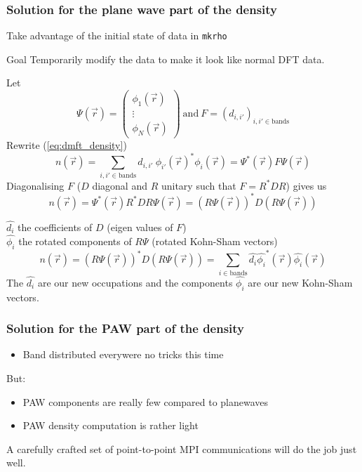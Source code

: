 \begin{frame}
  \frametitle{Solution for the plane wave part of the density}
  Take advantage of the initial state of data in \texttt{mkrho}
  
  \begin{block}{Goal}
    Temporarily modify the data to make it look like normal DFT data.
  \end{block}
\end{frame}

\renewcommand{\hat}{\widehat}
\begin{frame}
  Let
  \begin{equation}
    \Psi(\vec{r}) =
    \left(
    \begin{matrix}
      \phi_1(\vec{r})\\
      \vdots\\
      \phi_N(\vec{r})
    \end{matrix}
    \right)
      ~
    \text{and} ~ F = (d_{i,i'})_{i,i' \in \text{bands}}
  \end{equation}
  Rewrite (\ref{eq:dmft_density})
  \begin{equation}
    n(\vec{r}) =
    \sum_{i, i' \in \text{bands}} d_{i,i'}~\phi_{i'}(\vec{r})^* \phi_i(\vec{r})
    = \Psi^*(\vec{r}) F \Psi(\vec{r})
  \end{equation}
  Diagonalising $F$ ($D$ diagonal and $R$ unitary such that $F = R^*  D R$) gives us
  \begin{equation}
    n(\vec{r}) = \Psi^*(\vec{r}) R^* D R \Psi(\vec{r})
    = (R \Psi(\vec{r}))^* D (R \Psi(\vec{r}))
  \end{equation}
\end{frame}

\begin{frame}
  $\hat{d_i}$ the coefficients of $D$ (eigen values of $F$) \\
  $\hat{\phi_i}$ the rotated components of $R\Psi$ (rotated Kohn-Sham vectors)
  \begin{equation}
    n(\vec{r}) = (R \Psi(\vec{r}))^* D (R \Psi(\vec{r}))  = \sum_{i \in \text{bands}} \hat{d_i} \hat{\phi_i}^*(\vec{r}) \hat{\phi_i}(\vec{r}) 
  \end{equation}
  The $\hat{d_i}$ are our new occupations and the components $\hat{\phi_i}$ are our new Kohn-Sham vectors.
\end{frame}

\begin{frame}
  \frametitle{Solution for the PAW part of the density}
  \begin{itemize}
    \item Band distributed everywere \Rightarrow no tricks this time
  \end{itemize}
  But:
  \begin{itemize}
    \item PAW components are really few compared to planewaves
    \item PAW density computation is rather light
  \end{itemize}
  A carefully crafted set of point-to-point MPI communications will do the job
  just well.
\end{frame}

